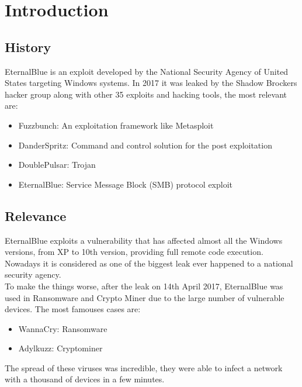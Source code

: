 \section{Introduction}
\subsection{History}
EternalBlue is an exploit developed by the National Security Agency of United States targeting Windows systems\cite{nsa-hacked}.
In 2017 it was leaked by the Shadow Brockers hacker group along with other 35 exploits and hacking
tools, the most relevant are:
\begin{itemize}
    \item Fuzzbunch: An exploitation framework like Metasploit
    \item DanderSpritz: Command and control solution for the post exploitation
    \item DoublePulsar: Trojan
    \item EternalBlue: Service Message Block (SMB) protocol exploit
\end{itemize}

\subsection{Relevance}
EternalBlue exploits a vulnerability that has affected almost all the Windows versions, from XP to 10th version, providing full remote code execution\cite{microsoft-bulletin}.
Nowadays it is considered as one of the biggest leak ever happened to a national security agency.\\
To make the things worse, after the leak on 14th April 2017, EternalBlue was used in Ransomware\cite{exploit-wannacryptor} and Crypto Miner due to the large number of vulnerable devices.
The most famouses cases are:
\begin{itemize}
    \item WannaCry: Ransomware
    \item Adylkuzz: Cryptominer
\end{itemize}
The spread of these viruses was incredible, they were able to infect a network with a thousand of devices in a few minutes.